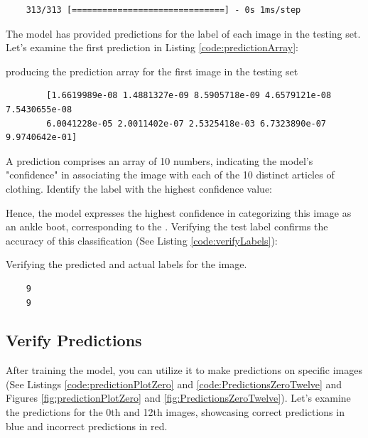 \begin{verbatim}
	313/313 [==============================] - 0s 1ms/step
\end{verbatim}

The model has provided predictions for the label of each image in the testing set. Let's examine the first prediction in Listing \ref{code:predictionArray}:

\begin{code}[h!]
	    
	
	\caption{producing the prediction array for the first image in the testing set}
	\label{code:predictionArray}
\end{code}

{\footnotesize
	\begin{verbatim}
		[1.6619989e-08 1.4881327e-09 8.5905718e-09 4.6579121e-08 7.5430655e-08
		6.0041228e-05 2.0011402e-07 2.5325418e-03 6.7323890e-07 9.9740642e-01]
	\end{verbatim}
}

A prediction comprises an array of 10 numbers, indicating the model's "confidence" in associating the image with each of the 10 distinct articles of clothing. Identify the label with the highest confidence value:

Hence, the model expresses the highest confidence in categorizing this image as an ankle boot, corresponding to the . Verifying the test label confirms the accuracy of this classification (See Listing \ref{code:verifyLabels}):

\begin{code}[h!]
	    
	
	\caption{Verifying the predicted and actual labels for the image.}
	\label{code:verifyLabels}
\end{code}


\begin{verbatim}
	9
	9
\end{verbatim}

\subsection{Verify Predictions}

After training the model, you can utilize it to make predictions on specific images (See Listings \ref{code:predictionPlotZero} and \ref{code:PredictionsZeroTwelve} and Figures \ref{fig:predictionPlotZero} and \ref{fig:PredictionsZeroTwelve}). Let's examine the predictions for the 0th and 12th images, showcasing correct predictions in blue and incorrect predictions in red.

